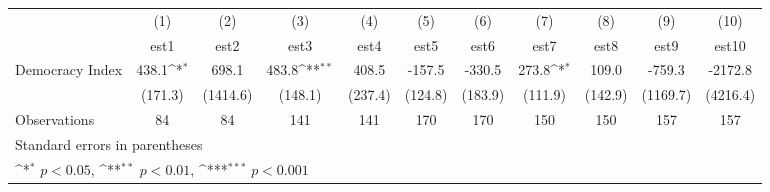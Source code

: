 {
\def\sym#1{\ifmmode^{#1}\else\(^{#1}\)\fi}
\begin{tabular}{l*{10}{c}}
\hline\hline
                    &\multicolumn{1}{c}{(1)}         &\multicolumn{1}{c}{(2)}         &\multicolumn{1}{c}{(3)}         &\multicolumn{1}{c}{(4)}         &\multicolumn{1}{c}{(5)}         &\multicolumn{1}{c}{(6)}         &\multicolumn{1}{c}{(7)}         &\multicolumn{1}{c}{(8)}         &\multicolumn{1}{c}{(9)}         &\multicolumn{1}{c}{(10)}         \\
                    &        est1         &        est2         &        est3         &        est4         &        est5         &        est6         &        est7         &        est8         &        est9         &       est10         \\
\hline
Democracy Index     &       438.1\sym{*}  &       698.1         &       483.8\sym{**} &       408.5         &      -157.5         &      -330.5         &       273.8\sym{*}  &       109.0         &      -759.3         &     -2172.8         \\
                    &     (171.3)         &    (1414.6)         &     (148.1)         &     (237.4)         &     (124.8)         &     (183.9)         &     (111.9)         &     (142.9)         &    (1169.7)         &    (4216.4)         \\
\hline
Observations        &          84         &          84         &         141         &         141         &         170         &         170         &         150         &         150         &         157         &         157         \\
\hline\hline
\multicolumn{11}{l}{\footnotesize Standard errors in parentheses}\\
\multicolumn{11}{l}{\footnotesize \sym{*} \(p<0.05\), \sym{**} \(p<0.01\), \sym{***} \(p<0.001\)}\\
\end{tabular}
}
